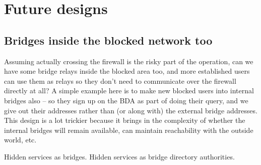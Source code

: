 \documentclass{llncs}
\begin{document}
\section{Future designs}

\subsection{Bridges inside the blocked network too}

Assuming actually crossing the firewall is the risky part of the
operation, can we have some bridge relays inside the blocked area too,
and more established users can use them as relays so they don't need to
communicate over the firewall directly at all? A simple example here is
to make new blocked users into internal bridges also -- so they sign up
on the BDA as part of doing their query, and we give out their addresses
rather than (or along with) the external bridge addresses. This design
is a lot trickier because it brings in the complexity of whether the
internal bridges will remain available, can maintain reachability with
the outside world, etc.

Hidden services as bridges. Hidden services as bridge directory authorities.

 
\end{document}
